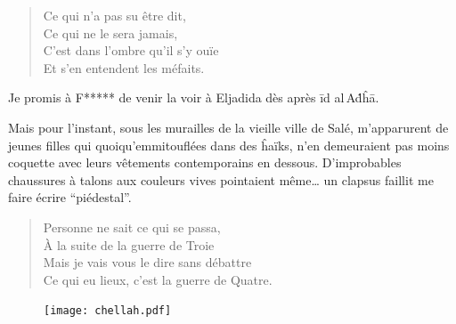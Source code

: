 \begin{verse}
Ce qui n’a pas su être dit,\\
Ce qui ne le sera jamais,\\
C’est dans l’ombre qu’il s’y ouïe\\
Et s’en entendent les méfaits.
\end{verse}

\begin{prose}
Je promis à F***** de venir la voir à Eljadida dès après īd al\,Aḋĥā.
\end{prose}

\begin{prose}
Mais pour l’instant, sous les murailles de la vieille ville de Salé, m’apparurent de jeunes filles qui quoiqu’emmitouflées dans des ĥaïks, n’en demeuraient pas moins coquette avec leurs vêtements contemporains en dessous. D’improbables chaussures à talons aux couleurs vives pointaient même… un clapsus faillit me faire écrire \enquote{piédestal}.
\end{prose}

\begin{verse}
Personne ne sait ce qui se passa,\\
À la suite de la guerre de Troie\\
Mais je vais vous le dire sans  débattre\\
Ce qui eu lieux, c’est la guerre de Quatre.
\end{verse}


\begin{figure}[h]
\centering
\texttt{[image: chellah.pdf]}
\captionsetup{labelformat=empty}
\caption[Idéotexte du  (\textarabic{شالة})]{}
\end{figure}




